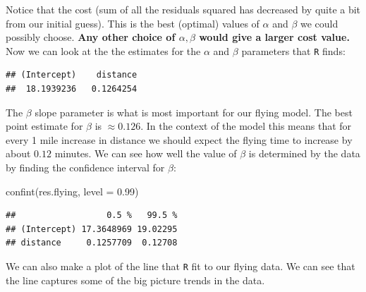 \documentclass[
]{book}
\newenvironment{Shaded}{\begin{snugshade}}{\end{snugshade}}
\newcommand{\AttributeTok}[1]{\textcolor[rgb]{0.77,0.63,0.00}{#1}}
\newcommand{\FloatTok}[1]{\textcolor[rgb]{0.00,0.00,0.81}{#1}}
\newcommand{\FunctionTok}[1]{\textcolor[rgb]{0.00,0.00,0.00}{#1}}
\newcommand{\NormalTok}[1]{#1}
\newcommand{\SpecialCharTok}[1]{\textcolor[rgb]{0.00,0.00,0.00}{#1}}
\newcommand{\StringTok}[1]{\textcolor[rgb]{0.31,0.60,0.02}{#1}}
\theoremstyle{definition}
\theoremstyle{definition}
\theoremstyle{definition}
\theoremstyle{definition}
\theoremstyle{remark}
\begin{document}
Notice that the cost (sum of all the residuals squared has decreased by quite a bit from our initial guess). This is the best (optimal) values of \(\alpha\) and \(\beta\) we could possibly choose. \textbf{Any other choice of \(\alpha, \beta\) would give a larger cost value.}
Now we can look at the the estimates for the \(\alpha\) and \(\beta\) parameters that \texttt{R} finds:

\begin{Shaded}
\end{Shaded}

\begin{verbatim}
## (Intercept)    distance 
##  18.1939236   0.1264254
\end{verbatim}

The \(\beta\) slope parameter is what is most important for our flying model. The best point estimate for \(\beta\) is \(\approx 0.126\). In the context of the model this means that for every 1 mile increase in distance we should expect the flying time to increase by about \(0.12\) minutes. We can see how well the value of \(\beta\) is determined by the data by finding the confidence interval for \(\beta\):

\begin{Shaded}
\begin{Highlighting}[]
\FunctionTok{confint}\NormalTok{(res.flying, }\AttributeTok{level =} \FloatTok{0.99}\NormalTok{)}
\end{Highlighting}
\end{Shaded}

\begin{verbatim}
##                  0.5 %   99.5 %
## (Intercept) 17.3648969 19.02295
## distance     0.1257709  0.12708
\end{verbatim}

We can also make a plot of the line that \texttt{R} fit to our flying data. We can see that the line captures some of the big picture trends in the data.

\begin{Shaded}
\end{Shaded}
\end{document}
